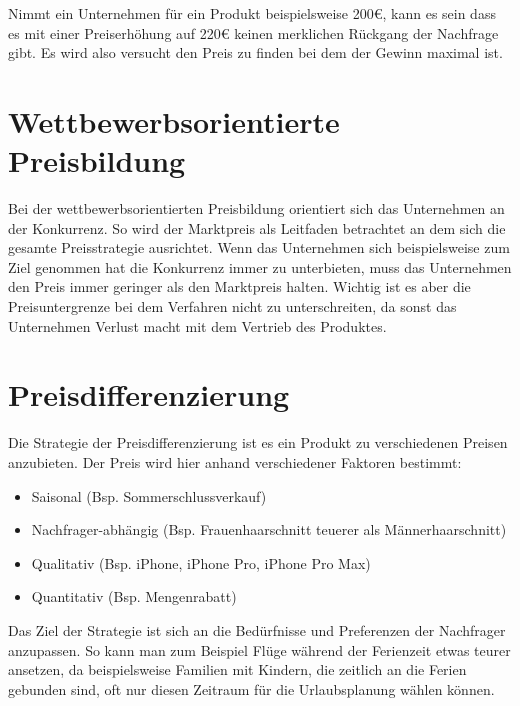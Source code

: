 Nimmt ein Unternehmen für ein Produkt beispielsweise 200\euro{}, kann es sein dass es mit einer Preiserhöhung auf 220\euro{} keinen merklichen Rückgang der Nachfrage gibt. Es wird also versucht den Preis zu finden bei dem der Gewinn maximal ist.

\section{Wettbewerbsorientierte Preisbildung}

Bei der wettbewerbsorientierten Preisbildung orientiert sich das Unternehmen an der Konkurrenz. So wird der Marktpreis als Leitfaden betrachtet an dem sich die gesamte Preisstrategie ausrichtet. Wenn das Unternehmen sich beispielsweise zum Ziel genommen hat die Konkurrenz immer zu unterbieten, muss das Unternehmen den Preis immer geringer als den Marktpreis halten. Wichtig ist es aber die Preisuntergrenze bei dem Verfahren nicht zu unterschreiten, da sonst das Unternehmen Verlust macht mit dem Vertrieb des Produktes.

\section{Preisdifferenzierung}

Die Strategie der Preisdifferenzierung ist es ein Produkt zu verschiedenen Preisen anzubieten. Der Preis wird hier anhand verschiedener Faktoren bestimmt:
\begin{itemize}
  \item Saisonal (Bsp. Sommerschlussverkauf)
  \item Nachfrager-abhängig (Bsp. Frauenhaarschnitt teuerer als Männerhaarschnitt)
  \item Qualitativ (Bsp. iPhone, iPhone Pro, iPhone Pro Max)
  \item Quantitativ (Bsp. Mengenrabatt)
\end{itemize}

Das Ziel der Strategie ist sich an die Bedürfnisse und Preferenzen der Nachfrager anzupassen. So kann man zum Beispiel Flüge während der Ferienzeit etwas teurer ansetzen, da beispielsweise Familien mit Kindern, die zeitlich an die Ferien gebunden sind, oft nur diesen Zeitraum für die Urlaubsplanung wählen können.

